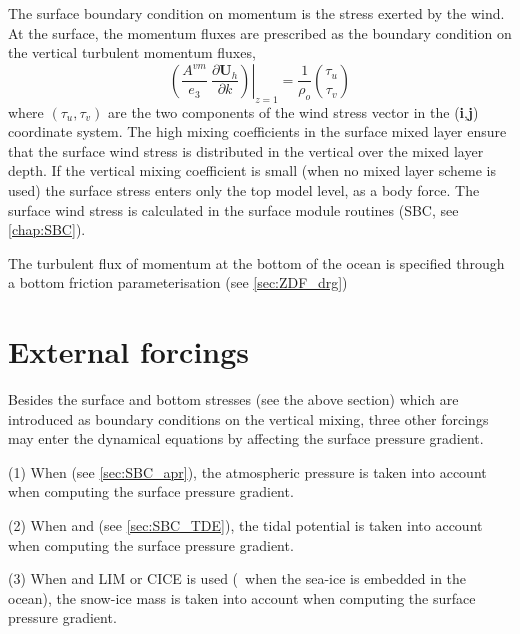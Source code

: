 \documentclass[../main/NEMO_manual]{subfiles}
\begin{document}
The surface boundary condition on momentum is the stress exerted by the wind.
At the surface, the momentum fluxes are prescribed as the boundary condition on
the vertical turbulent momentum fluxes,
\begin{equation}
  \label{eq:DYN_zdf_sbc}
  \left.{\left( {\frac{A^{vm} }{e_3 }\ \frac{\partial \textbf{U}_h}{\partial k}} \right)} \right|_{z=1}
  = \frac{1}{\rho_o} \binom{\tau_u}{\tau_v }
\end{equation}
where $\left( \tau_u ,\tau_v \right)$ are the two components of the wind stress vector in
the (\textbf{i},\textbf{j}) coordinate system.
The high mixing coefficients in the surface mixed layer ensure that the surface wind stress is distributed in
the vertical over the mixed layer depth.
If the vertical mixing coefficient is small (when no mixed layer scheme is used)
the surface stress enters only the top model level, as a body force.
The surface wind stress is calculated in the surface module routines (SBC, see \autoref{chap:SBC}).

The turbulent flux of momentum at the bottom of the ocean is specified through a bottom friction parameterisation
(see \autoref{sec:ZDF_drg})

\section{External forcings}
\label{sec:DYN_forcing}

Besides the surface and bottom stresses (see the above section)
which are introduced as boundary conditions on the vertical mixing,
three other forcings may enter the dynamical equations by affecting the surface pressure gradient.

(1) When  (see \autoref{sec:SBC_apr}),
the atmospheric pressure is taken into account when computing the surface pressure gradient.

(2) When  and  (see \autoref{sec:SBC_TDE}),
the tidal potential is taken into account when computing the surface pressure gradient.

(3) When  and LIM or CICE is used
(\ie\ when the sea-ice is embedded in the ocean),
the snow-ice mass is taken into account when computing the surface pressure gradient.

\end{document}
